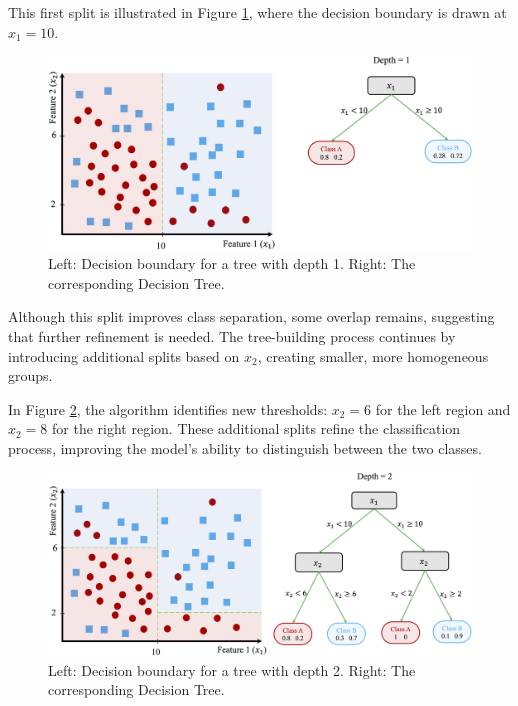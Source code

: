 \documentclass[
  11pt,
]{book}
\theoremstyle{definition}
\theoremstyle{definition}
\theoremstyle{definition}
\theoremstyle{definition}
\theoremstyle{remark}
\begin{document}
This first split is illustrated in Figure \ref{fig:tree-2}, where the decision boundary is drawn at \(x_1 = 10\).

\begin{figure}[H]

{\centering \includegraphics[width=1\linewidth]{images/ch11_ex_tree_2} 

}

\caption{Left: Decision boundary for a tree with depth 1. Right: The corresponding Decision Tree.}\label{fig:tree-2}
\end{figure}

Although this split improves class separation, some overlap remains, suggesting that further refinement is needed. The tree-building process continues by introducing additional splits based on \(x_2\), creating smaller, more homogeneous groups.

In Figure \ref{fig:tree-3}, the algorithm identifies new thresholds: \(x_2 = 6\) for the left region and \(x_2 = 8\) for the right region. These additional splits refine the classification process, improving the model's ability to distinguish between the two classes.

\begin{figure}[H]

{\centering \includegraphics[width=1\linewidth]{images/ch11_ex_tree_3} 

}

\caption{Left: Decision boundary for a tree with depth 2. Right: The corresponding Decision Tree.}\label{fig:tree-3}
\end{figure}
\end{document}
